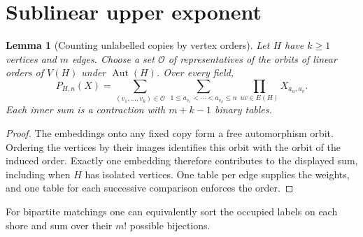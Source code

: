 \documentclass[11pt]{article}
\newtheorem{lemma}[theorem]{Lemma}
\theoremstyle{remark}
\begin{document}
\section{Sublinear upper exponent}\label{upper}
\begin{lemma}[Counting unlabelled copies by vertex orders]\label{orders}
Let $H$ have $k\ge1$ vertices and $m$ edges. Choose a set $\mathcal O$ of representatives of the orbits of linear orders of $V(H)$ under $\operatorname{Aut}(H)$. Over every field,
\[
 P_{H,n}(X)=\sum_{(v_1,\ldots,v_k)\in\mathcal O}
 \ \sum_{1\le a_{v_1}<\cdots<a_{v_k}\le n}\prod_{uv\in E(H)} X_{a_u,a_v}.
\]
Each inner sum is a contraction with $m+k-1$ binary tables.
\end{lemma}
\begin{proof}
The embeddings onto any fixed copy form a free automorphism orbit. Ordering the vertices by their images identifies this orbit with the orbit of the induced order. Exactly one embedding therefore contributes to the displayed sum, including when $H$ has isolated vertices. One table per edge supplies the weights, and one table for each successive comparison enforces the order.
\end{proof}
For bipartite matchings one can equivalently sort the occupied labels on each shore and sum over their $m!$ possible bijections.
\end{document}
